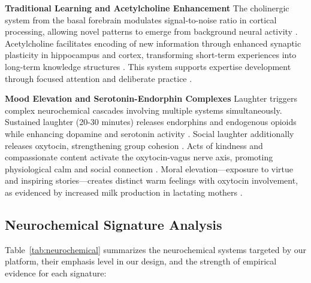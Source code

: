 \documentclass{article}
\begin{document}
\textbf{Traditional Learning and Acetylcholine Enhancement}
The cholinergic system from the basal forebrain modulates signal-to-noise ratio in cortical processing, allowing novel patterns to emerge from background neural activity \cite{hasselmo2006role, thiele2018neuromodulation}. Acetylcholine facilitates encoding of new information through enhanced synaptic plasticity in hippocampus and cortex, transforming short-term experiences into long-term knowledge structures \cite{picciotto2012acetylcholine}. This system supports expertise development through focused attention and deliberate practice \cite{mcgaughy2002behavioral}.

\textbf{Mood Elevation and Serotonin-Endorphin Complexes}
Laughter triggers complex neurochemical cascades involving multiple systems simultaneously. Sustained laughter (20-30 minutes) releases endorphins and endogenous opioids while enhancing dopamine and serotonin activity \cite{manninen2017social, yim2016therapeutic}. Social laughter additionally releases oxytocin, strengthening group cohesion \cite{dunbar2012social}. Acts of kindness and compassionate content activate the oxytocin-vagus nerve axis, promoting physiological calm and social connection \cite{stellar2015affective}. Moral elevation—exposure to virtue and inspiring stories—creates distinct warm feelings with oxytocin involvement, as evidenced by increased milk production in lactating mothers \cite{silvers2008moral}.

\subsection{Neurochemical Signature Analysis}

Table~\ref{tab:neurochemical} summarizes the neurochemical systems targeted by our platform, their emphasis level in our design, and the strength of empirical evidence for each signature:
\end{document}
